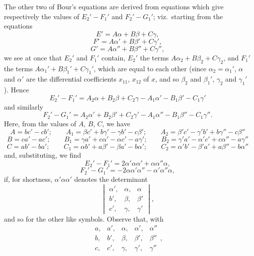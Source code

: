 \documentclass[11pt,a4paper]{article}
\begin{document}
The other two of Bour's equations are derived from equations which give
respectively the values of $E_{2}'-F_{1}'$ and $F_{2}'-G_{1}'$; viz.\
starting from the equations
\[
  E'=A\alpha+B\beta+C\gamma,
\]
\[
  F'=A\alpha'+B\beta'+C\gamma',
\]
\[
  G'=A\alpha''+B\beta''+C\gamma'',
\]
we see at once that $E_{2}'$ and $F_{1}'$ contain, $E_{2}'$ the terms
$A\alpha_{2}+B\beta_{2}+C\gamma_{2}$, and $F_{1}'$ the terms
$A\alpha_{1}'+B\beta_{1}'+C\gamma_{1}'$, which are equal to each other
(since $\alpha_{2}=\alpha_{1}'$, $\alpha$ and $\alpha'$ are the
differential coefficients $x_{11}$, $x_{12}$ of $x$, and so $\beta_{2}$
and $\beta_{1}'$, $\gamma_{2}$ and $\gamma_{1}'$). Hence
\[
  E_{2}'-F_{1}'=A_{2}\alpha+B_{2}\beta+C_{2}\gamma-A_{1}\alpha'-B_{1}\beta'-C_{1}\gamma'
\]
and similarly
\[
  F_{2}'-G_{1}'=A_{2}\alpha'+B_{2}\beta'+C_{2}\gamma'-A_{1}\alpha''-B_{1}\beta''-C_{1}\gamma''.
\]
Here, from the values of $A$, $B$, $C$, we have
\[
  A=bc'-cb';\qquad A_{1}=\beta c'+b\gamma'-\gamma b'-c\beta';\qquad A_{2}=\beta'c'-\gamma'b'+b\gamma''-c\beta''
\]
\[
  B=ca'-ac';\qquad B_{1}=\gamma a'+c\alpha'-\alpha c'-a\gamma';\qquad B_{2}=\gamma'a'-\alpha'c'+c\alpha''-a\gamma''
\]
\[
  C=ab'-ba';\qquad C_{1}=\alpha b'+a\beta'-\beta a'-b\alpha';\qquad C_{2}=\alpha'b'-\beta'a'+a\beta''-b\alpha''
\]
and, substituting, we find
\[
  E_{2}'-F_{1}'=2\alpha'\alpha\alpha'+\alpha\alpha''\alpha,
\]
\[
  F_{2}'-G_{1}'=-2\alpha\alpha'\alpha''-\alpha'\alpha''\alpha,
\]
if, for shortness, $\alpha'\alpha\alpha'$ denotes the determinant
\[
  \begin{vmatrix} \alpha',&\alpha,&\alpha\\ b',&\beta,&\beta'\\ c',&\gamma,&\gamma' \end{vmatrix},
\]
and so for the other like symbols. Observe that, with
\[
  \begin{array}{ccccc} a,&a',&\alpha,&\alpha',&\alpha''\\ b,&b',&\beta,&\beta',&\beta''\\ c,&c',&\gamma,&\gamma',&\gamma'' \end{array},
\]
\end{document}
